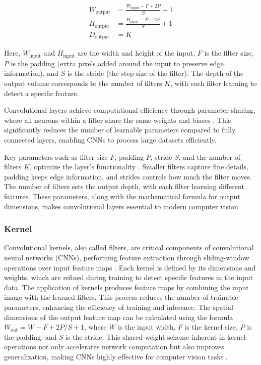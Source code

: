 \begin{align}
    W_{\text{output}} &= \frac{W_{\text{input}} - F + 2P}{S} + 1\\
     H_{\text{output}} &= \frac{H_{\text{input}} - F + 2P}{S} + 1\\
    \label{conv_spatial}
    D_{\text{output}} &= K
\end{align}


Here, \( W_{\text{input}} \) and \( H_{\text{input}} \) are the width and height of the input, \( F \) is the filter size, \( P \) is the padding (extra pixels added around the input to preserve edge information), and \( S \) is the stride (the step size of the filter). The depth of the output volume corresponds to the number of filters \( K \), with each filter learning to detect a specific feature.

Convolutional layers achieve computational efficiency through parameter sharing, where all neurons within a filter share the same weights and biases \cite{cs231n_cnn}. This significantly reduces the number of learnable parameters compared to fully connected layers, enabling CNNs to process large datasets efficiently.

Key parameters such as filter size \(F\), padding \(P\), stride \(S\), and the number of filters \(K\), optimize the layer's functionality \cite{cs231n_cnn}. Smaller filters capture fine details, padding keeps edge information, and strides controls how much the filter moves. The number of filters sets the output depth, with each filter learning different features. These parameters, along with the mathematical formula for output dimensions, makes convolutional layers essential to modern computer vision.

\subsubsection{Kernel}

Convolutional kernels, also called filters, are critical components of convolutional neural networks (CNNs), performing feature extraction through sliding-window operations over input feature maps \cite{jain2020convolutions}. Each kernel is defined by its dimensions and weights, which are refined during training to detect specific features in the input data. The application of kernels produces feature maps by combining the input image with the learned filters. This process reduces the number of trainable parameters, enhancing the efficiency of training and inference. The spatial dimensions of the output feature map can be calculated using the formula \( W_{\text{out}} = W - F + 2P/S + 1 \), where \( W \) is the input width, \( F \) is the kernel size, \( P \) is the padding, and \( S \) is the stride. This shared-weight scheme inherent in kernel operations not only accelerates network computation but also improves generalization, making CNNs highly effective for computer vision tasks \cite{bhatt2021cnn}.

